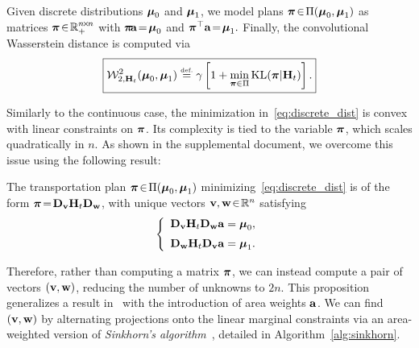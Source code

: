 Given discrete distributions $\boldsymbol{\mu}_0$ and $\boldsymbol{\mu}_1$,
we model plans $\boldsymbol{\pi}\!\in\!\Pi(\boldsymbol{\mu}_0,\boldsymbol{\mu}_1)$ as matrices $\boldsymbol{\pi}\!\in\!\mathbb{R}_+^{n\!\times\!n}$ with $\boldsymbol{\pi}\!\mathbf a\!=\!\boldsymbol{\mu}_0$ and $\boldsymbol{\pi}^\top\mathbf a\!=\!\boldsymbol{\mu}_1.$  
%
Finally, the convolutional Wasserstein distance is computed via
\begin{equation}\label{eq:discrete_dist}
	\boxed{\W^2_{2,\kernel}(\p_0,\p_1) \eqdef \gamma\left[1+\min_{\bpi\in\Pi}\KL(\bpi|\kernel)\right].}
\end{equation}


Similarly to the continuous case, the minimization in~\eqref{eq:discrete_dist} is convex with linear constraints on $\boldsymbol{\pi}$.  Its complexity is tied to the variable $\boldsymbol{\pi}$, which scales quadratically in $n$.  As shown in the supplemental document, we overcome this issue using the following result:
\begin{proposition}
\label{prop:sinkhorn}
The transportation plan $\boldsymbol{\pi}\!\in\!\Pi(\boldsymbol{\mu}_0,\boldsymbol{\mu}_1)$ minimizing~\eqref{eq:discrete_dist} is of the form $\boldsymbol{\pi}\!=\!\mathbf{D}_{\mathbf v}\mathbf{H}_t\mathbf{D}_{\mathbf w}$, with unique vectors $\mathbf v,\mathbf w\!\in\!\mathbb{R}^n$ satisfying
\begin{equation}
\left\{
\begin{array}{l}
\mathbf{D}_{\mathbf v} \mathbf{H}_t \mathbf{D}_{\mathbf w}\mathbf a = \boldsymbol{\mu}_0,
\\[2mm]
\mathbf{D}_{\mathbf w} \mathbf{H}_t \mathbf{D}_{\mathbf v}\mathbf a = \boldsymbol{\mu}_1.
\end{array}
\right.
\label{eq:constraints}
\end{equation}
\end{proposition}
Therefore, rather than computing a matrix $\boldsymbol{\pi}$, we can instead compute a pair of vectors $(\mathbf v,\mathbf w)$, reducing the number of unknowns to $2n$. This proposition generalizes a result in~\cite{cuturi-2013} with the introduction of area weights $\mathbf a$. We can find $(\mathbf v,\mathbf w)$ by alternating projections onto the linear marginal constraints via %
an area-weighted version of \emph{Sinkhorn's algorithm}~, detailed in Algorithm~\ref{alg:sinkhorn}.

